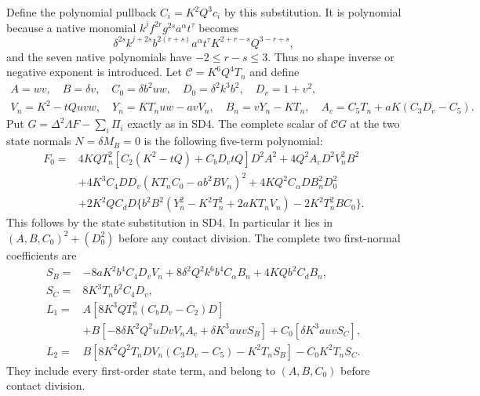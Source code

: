 Define the polynomial pullback $C_i=K^2Q^3c_i$ by this substitution.
It is polynomial because a native monomial
$k^jf^{2r}g^{2s}a^\alpha t^\tau$ becomes
\[
 \delta^{2s}k^{j+2s}b^{2(r+s)}a^\alpha t^\tau
                         K^{2+r-s}Q^{3-r+s},\tag{SD7}
\]
and the seven native polynomials have $-2\le r-s\le3$.
Thus no shape inverse or negative exponent is introduced.
Let $\mathcal C=K^6Q^4T_n$ and define
\[
\begin{gathered}
 A=wv,\quad B=\delta v,\quad C_0=\delta b^2uw,
 \quad D_0=\delta^2k^3b^2,\quad D_v=1+v^2,\\
 V_n=K^2-tQuvw,\quad Y_n=KT_nuw-avV_n,\quad
 B_n=vY_n-KT_n,\quad A_c=C_5T_n+aK(C_3D_v-C_5).
\end{gathered}
\]
Put $G=\Delta^2\Lambda F-\sum_i\Pi_i$ exactly as in SD4.
The complete scalar of $\mathcal CG$ at the two state
normals $N=\delta M_B=0$ is the following five-term polynomial:
\[
\begin{split}
 F_0={}&4KQT_n^2[C_2(K^2-tQ)+C_bD_vtQ]D^2A^2
       +4Q^2A_cD^2V_n^2B^2\\
 &+4K^3C_4DD_v(KT_nC_0-ab^2BV_n)^2
       +4KQ^2C_\alpha DB_n^2D_0^2\\
 &+2K^2QC_dD\{b^2B^2(Y_n^2-K^2T_n^2+2aKT_nV_n)
                                     -2K^2T_n^2BC_0\}.
\end{split}
\]
This follows by the state substitution in SD4. In particular it lies
in $(A,B,C_0)^2+(D_0^2)$ before any contact division.
The complete two first-normal coefficients are
\[
\begin{split}
 S_B={}&-8aK^2b^4C_4D_vV_n
       +8\delta^2Q^2k^6b^4C_\alpha B_n+4KQb^2C_dB_n,\\
 S_C={}&8K^3T_nb^2C_4D_v,\\
 L_1={}&A[8K^3QT_n^2(C_bD_v-C_2)D]\\
       &+B[-8\delta K^2Q^2uDvV_nA_c+\delta K^3auvS_B]
                         +C_0[\delta K^3auvS_C],\\
 L_2={}&B[8K^2Q^2T_nDV_n(C_3D_v-C_5)-K^2T_nS_B]
                                      -C_0K^2T_nS_C.
\end{split}\tag{SD8}
\]
They include every first-order state term, and belong to
$(A,B,C_0)$ before contact division.

